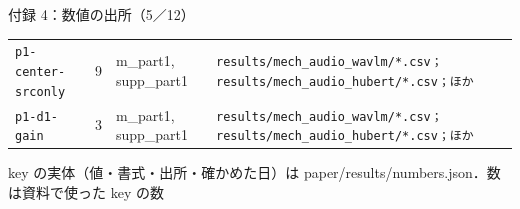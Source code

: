 \begin{frame}{付録 4：数値の出所（5／12）}
\begin{tabularx}{\textwidth}{@{}l r l X@{}}
    \texttt{p1-center-srconly} & 9 & m\_part1, supp\_part1 & \texttt{results/\allowbreak{}mech\_\allowbreak{}audio\_\allowbreak{}wavlm/\allowbreak{}*.csv；results/\allowbreak{}mech\_\allowbreak{}audio\_\allowbreak{}hubert/\allowbreak{}*.csv；ほか} \\
    \texttt{p1-d1-gain} & 3 & m\_part1, supp\_part1 & \texttt{results/\allowbreak{}mech\_\allowbreak{}audio\_\allowbreak{}wavlm/\allowbreak{}*.csv；results/\allowbreak{}mech\_\allowbreak{}audio\_\allowbreak{}hubert/\allowbreak{}*.csv；ほか} \\
    \bottomrule
  \end{tabularx}\par
  {\raggedright\tiny key の実体（値・書式・出所・確かめた日）は paper/results/numbers.json．数は資料で使った key の数\par}
\end{frame}
